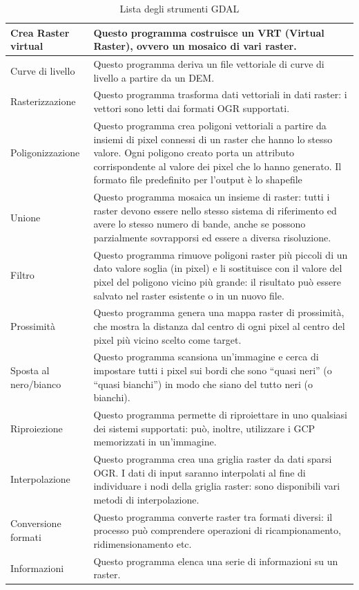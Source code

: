 {\setlength{\extrarowheight}{15pt}
\begin{longtable}{|p{3cm}|p{13cm}|}
\caption{Lista degli strumenti GDAL}\label{tab:gdaltools} \\
\hline
Crea Raster virtual& Questo programma costruisce un VRT (Virtual Raster), ovvero un mosaico di vari raster. \\
\hline Curve di livello & Questo programma deriva un file vettoriale di curve di livello a partire da un DEM.\\
\hline Rasterizzazione &  Questo programma trasforma dati vettoriali in dati raster: i vettori sono letti dai 
formati OGR supportati. \\
\hline Poligonizzazione & Questo programma crea poligoni vettoriali a partire da insiemi di pixel connessi di un raster 
che hanno lo stesso valore. Ogni poligono creato porta un attributo corrispondente al valore dei pixel che lo hanno generato.
Il formato file predefinito per l'output è lo shapefile \\
\hline Unione &  Questo programma mosaica un insieme di raster: tutti i raster devono essere nello stesso sistema di riferimento 
ed avere lo stesso numero di bande, anche se possono parzialmente sovrapporsi ed essere a diversa risoluzione. \\
\hline Filtro & Questo programma rimuove poligoni raster più piccoli di un dato valore soglia (in pixel) e li sostituisce 
con il valore del pixel del poligono vicino più grande: il risultato può essere salvato nel raster esistente o in un nuovo file. \\
\hline Prossimità & Questo programma genera una mappa raster di prossimità, che mostra la distanza dal centro di ogni pixel 
al centro del pixel più vicino scelto come target. \\
\hline Sposta al nero/bianco & Questo programma scansiona un'immagine e cerca di impostare tutti i pixel sui bordi che sono ``quasi neri'' 
(o ``quasi bianchi'') in modo che siano del tutto neri (o bianchi).\\
\hline Riproiezione & Questo programma permette di riproiettare in uno qualsiasi dei sistemi supportati: può, inoltre, 
utilizzare i GCP memorizzati in un'immagine. \\
\hline Interpolazione & Questo programma crea una griglia raster da dati sparsi OGR. I dati di input saranno interpolati 
al fine di individuare i nodi della griglia raster: sono disponibili vari metodi di interpolazione.\\
\hline Conversione formati & Questo programma converte raster tra formati diversi: il processo può comprendere 
operazioni di ricampionamento, ridimensionamento etc.\\
\hline Informazioni & Questo programma elenca una serie di informazioni su un raster. \\


\end{longtable}}
